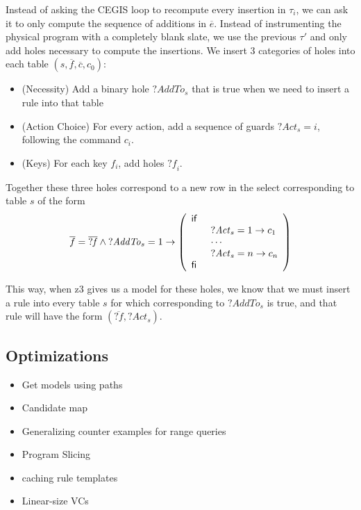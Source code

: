 
Instead of asking the CEGIS loop to recompute every insertion in
$\tau_i$, we can ask it to only compute the sequence of additions in
$\overline{e}$. Instead of instrumenting the physical program with a
completely blank slate, we use the previous $\tau'$ and only add holes
necessary to compute the insertions. We insert 3 categories of holes
into each table $(s, \overline f, \overline c, c_0)$:
\begin{itemize}
\item (Necessity) Add a binary hole $\mathit{?AddTo}_s$ that is true
  when we need to insert a rule into that table
\item (Action Choice) For every action, add a sequence of guards
  $\mathit{?Act}_s = i$, following the command $c_i$.
\item (Keys) For each key $f_i$, add holes $\mathit{?f}_i$.
\end{itemize}

Together these three holes correspond to a new row in the select
corresponding to table $s$ of the form
\[
  \begin{array}l
    \overline{f} = \overline{\mathit{?f}} \wedge \mathit{?AddTo}_s = 1
    \to \left(\begin{array}l \IF \\
          \qquad \mathit{?Act}_s = 1 \to c_1 \\
          \qquad \cdots\\
          \qquad \mathit{?Act}_s = n \to c_n \\
          \ENDIF
        \end{array} \right)
  \end{array}
\]

This way, when z3 gives us a model for these holes, we know that we
must insert a rule into every table $s$ for which corresponding to
$\mathit{?AddTo}_s$ is true, and that rule will have the form
$(\overline{\mathit{?f}}, \mathit{?Act}_s)$.



\subsection{Optimizations}
\begin{itemize}
\item Get models using paths
\item Candidate map
\item Generalizing counter examples for range queries
\item Program Slicing
\item caching rule templates
\item Linear-size VCs
\end{itemize}

